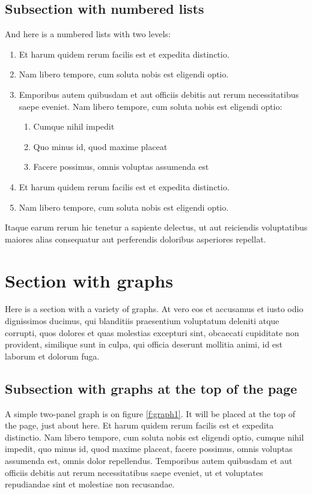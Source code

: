 \documentclass[letterpaper,11pt,leqno]{article}
\begin{document}
\subsection{Subsection with numbered lists}\label{s:numberedlists}

And here is a numbered lists with two levels:
\begin{enumerate}
\item Et harum quidem rerum facilis est et expedita distinctio.
\item Nam libero tempore, cum soluta nobis est eligendi optio.
\item Emporibus autem quibusdam et aut officiis debitis aut rerum necessitatibus saepe eveniet. Nam libero tempore, cum soluta nobis est eligendi optio:
\begin{enumerate}
	\item Cumque nihil impedit
	\item Quo minus id, quod maxime placeat
	\item Facere possimus, omnis voluptas assumenda est
\end{enumerate}
\item Et harum quidem rerum facilis est et expedita distinctio.
\item Nam libero tempore, cum soluta nobis est eligendi optio.
\end{enumerate}
Itaque earum rerum hic tenetur a sapiente delectus, ut aut reiciendis voluptatibus maiores alias consequatur aut perferendis doloribus asperiores repellat. 

\section{Section with graphs}\label{s:graphs}

Here is a section with a variety of graphs. At vero eos et accusamus et iusto odio dignissimos ducimus, qui blanditiis praesentium voluptatum deleniti atque corrupti, quos dolores et quas molestias excepturi sint, obcaecati cupiditate non provident, similique sunt in culpa, qui officia deserunt mollitia animi, id est laborum et dolorum fuga. 

\subsection{Subsection with graphs at the top of the page}

A simple two-panel graph is on figure \ref{f:graph1}. It will be placed at the top of the page, just about here. Et harum quidem rerum facilis est et expedita distinctio. Nam libero tempore, cum soluta nobis est eligendi optio, cumque nihil impedit, quo minus id, quod maxime placeat, facere possimus, omnis voluptas assumenda est, omnis dolor repellendus. Temporibus autem quibusdam et aut officiis debitis aut rerum necessitatibus saepe eveniet, ut et voluptates repudiandae sint et molestiae non recusandae.
\end{document}
